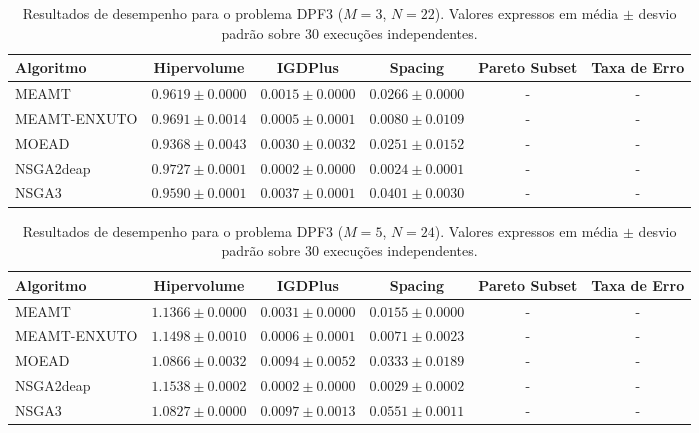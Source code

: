 \begin{table}[htpb]
\centering
\caption{Resultados de desempenho para o problema DPF3 ($M=3$, $N=22$). Valores expressos em média $\pm$ desvio padrão sobre 30 execuções independentes.}
\label{tab:DPF3_M3_N22}
\begin{tabular}{lccccc}
\hline\hline
Algoritmo & Hipervolume & IGDPlus & Spacing & Pareto Subset & Taxa de Erro \\
\hline
MEAMT & $0.9619 \pm 0.0000$ & $0.0015 \pm 0.0000$ & $0.0266 \pm 0.0000$ & - & - \\
MEAMT-ENXUTO & $0.9691 \pm 0.0014$ & $0.0005 \pm 0.0001$ & $0.0080 \pm 0.0109$ & - & - \\
MOEAD & $0.9368 \pm 0.0043$ & $0.0030 \pm 0.0032$ & $0.0251 \pm 0.0152$ & - & - \\
NSGA2deap & $0.9727 \pm 0.0001$ & $0.0002 \pm 0.0000$ & $0.0024 \pm 0.0001$ & - & - \\
NSGA3 & $0.9590 \pm 0.0001$ & $0.0037 \pm 0.0001$ & $0.0401 \pm 0.0030$ & - & - \\
\hline\hline
\end{tabular}
\end{table}

\begin{table}[htpb]
\centering
\caption{Resultados de desempenho para o problema DPF3 ($M=5$, $N=24$). Valores expressos em média $\pm$ desvio padrão sobre 30 execuções independentes.}
\label{tab:DPF3_M5_N24}
\begin{tabular}{lccccc}
\hline\hline
Algoritmo & Hipervolume & IGDPlus & Spacing & Pareto Subset & Taxa de Erro \\
\hline
MEAMT & $1.1366 \pm 0.0000$ & $0.0031 \pm 0.0000$ & $0.0155 \pm 0.0000$ & - & - \\
MEAMT-ENXUTO & $1.1498 \pm 0.0010$ & $0.0006 \pm 0.0001$ & $0.0071 \pm 0.0023$ & - & - \\
MOEAD & $1.0866 \pm 0.0032$ & $0.0094 \pm 0.0052$ & $0.0333 \pm 0.0189$ & - & - \\
NSGA2deap & $1.1538 \pm 0.0002$ & $0.0002 \pm 0.0000$ & $0.0029 \pm 0.0002$ & - & - \\
NSGA3 & $1.0827 \pm 0.0000$ & $0.0097 \pm 0.0013$ & $0.0551 \pm 0.0011$ & - & - \\
\hline\hline
\end{tabular}
\end{table}

